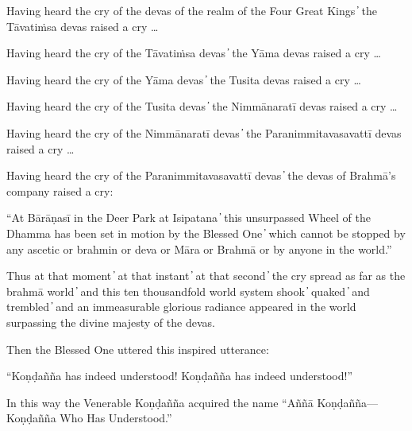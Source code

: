 Having heard the cry of the devas of the realm of the Four Great Kings  ̓  the Tāvatiṁsa devas raised a cry …

Having heard the cry of the Tāvatiṁsa devas  ̓  the Yāma devas raised a cry …

Having heard the cry of the Yāma devas  ̓  the Tusita devas raised a cry …

Having heard the cry of the Tusita devas  ̓  the Nimmānaratī devas raised a cry …

Having heard the cry of the Nimmānaratī devas  ̓  the Paranimmitavasavattī devas raised a cry …

Having heard the cry of the Paranimmitavasavattī devas  ̓  the devas of Brahmā’s company raised a cry:

“At Bārāṇasī in the Deer Park at Isipatana  ̓  this unsurpassed Wheel of the Dhamma has been set in motion by the Blessed One  ̓  which cannot be stopped by any ascetic or brahmin or deva or Māra or Brahmā or by anyone in the world.”

Thus at that moment  ̓  at that instant  ̓  at that second  ̓  the cry spread as far as the brahmā world  ̓  and this ten thousandfold world system shook  ̓  quaked  ̓  and trembled  ̓  and an immeasurable glorious radiance appeared in the world surpassing the divine majesty of the devas.

Then the Blessed One uttered this inspired utterance:

“Koṇḍañña has indeed understood! Koṇḍañña has indeed understood!”

In this way the Venerable Koṇḍañña acquired the name “Aññā Koṇḍañña—Koṇḍañña Who Has Understood.”

